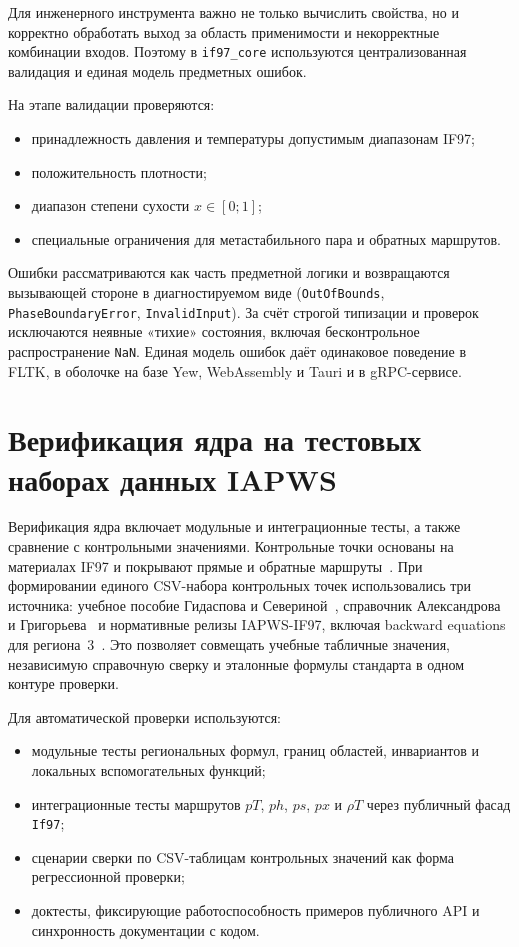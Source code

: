 Для инженерного инструмента важно
не только вычислить свойства,
но и корректно обработать выход за область применимости
и некорректные комбинации входов.
Поэтому в \texttt{if97\_core}
используются централизованная валидация
и единая модель предметных ошибок.

На этапе валидации проверяются:
\begin{itemize}
\item принадлежность давления и температуры допустимым диапазонам IF97;
\item положительность плотности;
\item диапазон степени сухости $x \in [0; 1]$;
\item специальные ограничения для метастабильного пара и обратных маршрутов.
\end{itemize}

Ошибки рассматриваются как часть предметной логики
и возвращаются вызывающей стороне в диагностируемом виде
(\texttt{OutOfBounds}, \texttt{PhaseBoundaryError}, \texttt{InvalidInput}).
За счёт строгой типизации и проверок
исключаются неявные «тихие» состояния,
включая бесконтрольное распространение \texttt{NaN}.
Единая модель ошибок даёт одинаковое поведение
в FLTK,
в оболочке на базе Yew, WebAssembly и Tauri
и в gRPC-сервисе.

\section{Верификация ядра на тестовых наборах данных IAPWS}

Верификация ядра включает модульные и интеграционные тесты,
а также сравнение с контрольными значениями.
Контрольные точки основаны на материалах IF97
и покрывают прямые и обратные маршруты~\cite{iapws_if97_2012}.
При формировании единого CSV-набора контрольных точек
использовались три источника:
учебное пособие Гидаспова и Севериной~\cite{gidaspov_severina_2014},
справочник Александрова и Григорьева~\cite{alexandrov_grigorev_1999}
и нормативные релизы IAPWS-IF97, включая backward equations для региона~3~\cite{iapws_vpt_region3}.
Это позволяет совмещать учебные табличные значения, независимую справочную сверку
и эталонные формулы стандарта в одном контуре проверки.

Для автоматической проверки используются:
\begin{itemize}
\item модульные тесты региональных формул, границ областей, инвариантов и локальных вспомогательных функций;
\item интеграционные тесты маршрутов $pT$, $ph$, $ps$, $px$ и $\rho T$ через публичный фасад \texttt{If97};
\item сценарии сверки по CSV-таблицам контрольных значений как форма регрессионной проверки;
\item доктесты, фиксирующие работоспособность примеров публичного API и синхронность документации с кодом.
\end{itemize}

